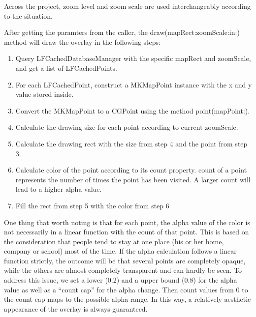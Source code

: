 \documentclass[12pt,a4paper]{article}
\renewcommand\texttt[1]{{\ttfamily\color{textttColor}#1}}
\begin{document}
            Across the project, zoom level and zoom scale are used interchangeably according to the situation. 
            
            After getting the paramters from the caller, the \texttt{draw(mapRect:zoomScale:in:)} method will draw the overlay in the following steps:
            
            \begin{enumerate}
                \item Query \texttt{LFCachedDatabaseManager} with the specific \texttt{mapRect} and \texttt{zoomScale}, and get a list of \texttt{LFCachedPoint}s.
                \item For each \texttt{LFCachedPoint}, construct a \texttt{MKMapPoint} instance with the \texttt{x} and \texttt{y} value stored inside.
                \item Convert the \texttt{MKMapPoint} to a \texttt{CGPoint} using the method \texttt{point(mapPoint:)}.
                \item Calculate the drawing size for each point according to current \texttt{zoomScale}.
                \item Calculate the drawing rect with the size from step 4 and the point from step 3.
                \item Calculate color of the point according to its \texttt
                {count} property. \texttt{count} of a point represents the number of times the point has been visited. A larger \texttt{count} will lead to a higher alpha value.
                \item Fill the rect from step 5 with the color from step 6
            \end{enumerate}
            
            One thing that worth noting is that for each point, the alpha value of the color is not necessarily in a linear function with the \texttt{count} of that point. This is based on the consideration that people tend to stay at one place (his or her home, company or school) most of the time. If the alpha calculation follows a linear function strictly, the outcome will be that several points are completely opaque, while the others are almost completely transparent and can hardly be seen. To address this issue, we set a lower (0.2) and a upper bound (0.8) for the alpha value as well as a ``count cap'' for the alpha change. Then \texttt{count} values from 0 to the count cap maps to the possible alpha range. In this way, a relatively aesthetic appearance of the overlay is always guaranteed.
            
\end{document}
